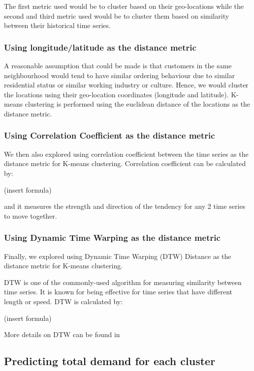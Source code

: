 \documentclass[12pt, letterpaper] {article}
\begin{document}
\noindent The first metric used would be to cluster based on their geo-locations while the second and third metric used would be to cluster them based on similarity between their historical time series. 

\subsubsection{Using longitude/latitude as the distance metric}

A reasonable assumption that could be made is that customers in the same neighbourhood would tend to have similar ordering behaviour due to similar residential status or similar working industry or culture. Hence, we would cluster the locations using their geo-location coordinates (longitude and latitude). K-means clustering is performed using the euclidean distance of the locations as the distance metric.   

\subsubsection{Using Correlation Coefficient as the distance metric}

We then also explored using correlation coefficient between the time series as the distance metric for K-means clustering. Correlation coefficient can be calculated by: 

(insert formula) 

\noindent and it measures the strength and direction of the tendency for any 2 time series to move together. 

\subsubsection{Using Dynamic Time Warping as the distance metric}

Finally, we explored using Dynamic Time Warping (DTW) Distance as the distance metric for K-means clustering. 

\noindent DTW is one of the commonly-used algorithm for measuring similarity between time series. It is known for being effective for time series that have different length or speed. DTW is calculated by:

(insert formula)

\noindent More details on DTW can be found in \cite{Pavel2008}  

\subsection{Predicting total demand for each cluster}
\end{document}
